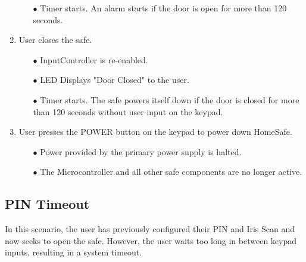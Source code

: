 \documentclass{article}
\begin{document}
\begin{enumerate}
\begin{enumerate}
        \item[$\bullet$] Timer starts. An alarm starts if the door is open for more than 120 seconds.
    \end{enumerate}
    \item User closes the safe.
    \begin{enumerate}
        \item[$\bullet$] InputController is re-enabled.
        \item[$\bullet$] LED Displays "Door Closed" to the user.
        \item[$\bullet$] Timer starts. The safe powers itself down if the door is closed for more than 120 seconds without user input on the keypad.
    \end{enumerate}
    \item User presses the POWER button on the keypad to power down HomeSafe.
    \begin{enumerate}
        \item[$\bullet$] Power provided by the primary power supply is halted.
        \item[$\bullet$] The Microcontroller and all other safe components are no longer active.
    \end{enumerate}

\end{enumerate}

\subsection{PIN Timeout}
In this scenario, the user has previously configured their PIN and Iris Scan and now seeks to open the safe. However, the user waits too long in between keypad inputs, resulting in a system timeout.
\end{document}
